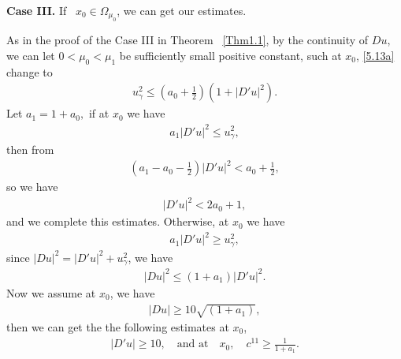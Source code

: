 \documentclass[11pt]{amsart}
\numberwithin{equation}{section}
\begin{document}
{\bf Case III.}  If ~$x_0\in\Omega_{\mu_0}$, we can get our estimates. \par
As in the proof of the Case III in Theorem ~\ref{Thm1.1}, by the continuity of $Du$,   we can let $0<\mu_{0}<\mu_1$ be sufficiently small positive constant,  such at $x_0$, \eqref{5.13a} change to
\begin{align}\label{5.14a}
 u_\gamma^2\le ( a_0 + \frac{1}{2})(1+|D'u|^2).
\end{align}
Let $a_1= 1 + a_0,$ if at $x_0$ we have
\begin{align}\label{5.14b}
a_1|D'u|^2\le u_\gamma^2,
\end{align}
 then from
 \begin{align}\label{5.14c}
(a_1-a_0-\frac{1}{2}) |D'u|^2<a_0 + \frac{1}{2},
\end{align}
so we have
 \begin{align}\label{5.14ca}
|D'u|^2<2a_0+1,
\end{align}
 and we complete this estimates.
  Otherwise,
 at $x_0$ we have
\begin{align}\label{5.14d}
a_1|D'u|^2\ge u_\gamma^2,
\end{align}
since  $|Du|^2=|D'u|^2+u_\gamma^2$, we have
 \begin{align}\label{5.14c}|Du|^2\leq (1+a_1)|D'u|^2.\end{align}
Now we assume at $x_0$,  we have
\begin{align}\label{5.14e}
|Du|\geq 10\sqrt{(1+a_1)},
 \end{align}
 then we can get the the following estimates at $x_0$,
 \begin{align}\label{5.14f} |D'u|\geq 10,
 \quad \text{and at}\quad  x_0,\quad  c^{11} \ge \frac{1}{1+a_1}.\end{align}
\end{document}
